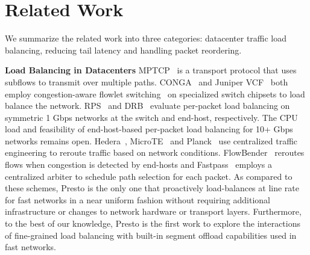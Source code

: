 \section{Related Work}
\label{sec:related}
We summarize the related work into three categories: datacenter traffic load balancing, reducing tail latency and handling packet reordering.

{\bf Load Balancing in Datacenters} 
MPTCP~\cite{mptcp,dc-mptcp} is a transport protocol that uses subflows to 
transmit over multiple paths.
CONGA~\cite{conga} and Juniper VCF~\cite{juniper-vcf} both employ congestion-aware flowlet switching~\cite{flowlet} on
specialized switch chipsets to load balance the network.
RPS~\cite{packetspray} and DRB~\cite{drb} evaluate per-packet load balancing on symmetric 1 Gbps networks
at the switch and end-host, respectively.
The CPU load and feasibility of end-host-based per-packet load balancing for 10+ Gbps networks remains open.
Hedera~\cite{hedera}, MicroTE~\cite{microte} and Planck~\cite{planck} use centralized traffic engineering to
reroute traffic based on network conditions.
FlowBender~\cite{flowbender} reroutes flows when congestion is detected by end-hosts and 
Fastpass~\cite{fastpass} employs a centralized arbiter to schedule path selection for each packet.
As compared to these schemes, Presto is the only one that proactively load-balances at line rate for fast networks
in a near uniform fashion without requiring additional infrastructure or changes
to network hardware or transport layers. Furthermore, to the best of our knowledge, Presto is
the first work to explore the interactions of fine-grained load balancing with built-in
segment offload capabilities used in fast networks.

